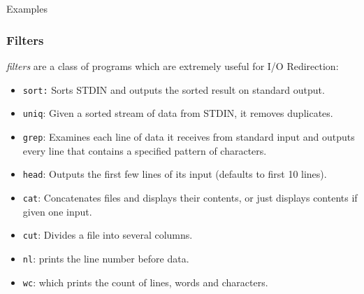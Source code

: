 \documentclass[10pt]{beamer}
\begin{document}
\subsection{}
\begin{frame}[fragile]{Examples}
\frametitle{Filters}
\emph{filters} are a class of programs which are extremely useful for I/O Redirection:\vspace{0.1in}
\begin{itemize} 
\item \texttt{sort:} Sorts STDIN and outputs the sorted result on standard output.\vspace{0.05in}
\item \texttt{uniq}: Given a sorted stream of data from STDIN, it removes duplicates.\vspace{0.05in}
\item \texttt{grep}: Examines each line of data it receives from standard input and outputs every line that contains a specified pattern of characters.\vspace{0.05in}
\item \texttt{head}: Outputs the first few lines of its input (defaults to first 10 lines).\vspace{0.05in}
\item \texttt{cat}: Concatenates files and displays their contents, or just displays contents if given one input.\vspace{0.05in}
\item \texttt{cut}: Divides a file into several columns.\vspace{0.05in}
\item \texttt{nl}: prints the line number before data.\vspace{0.05in}
\item \texttt{wc}: which prints the count of lines, words and characters.\vspace{0.05in}
\end{itemize}
\end{frame}
\end{document}
